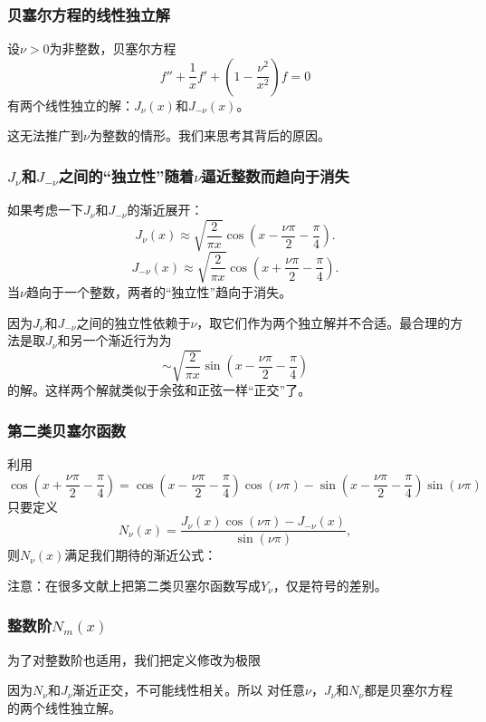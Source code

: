\documentclass[CJK]{beamer}
\begin{document}
\begin{frame}
\frametitle{贝塞尔方程的线性独立解}

设$\nu >0$为非整数，贝塞尔方程
$$f''+\frac{1}{x}f' + \left(1-\frac{\nu^2}{x^2}\right)f = 0$$
有两个线性独立的解：$J_\nu(x)$和$J_{-\nu}(x)$。

\skiplines

这无法推广到$\nu$为整数的情形。我们来思考其背后的原因。

\end{frame}

\begin{frame}
\frametitle{$J_\nu$和$J_{-\nu}$之间的“独立性”随着$\nu$逼近整数而趋向于消失}

如果考虑一下$J_\nu$和$J_{-\nu}$的渐近展开：
$$J_\nu(x) \approx \sqrt{\frac{2}{\pi x}}\cos{\left(x-\frac{\nu \pi}{2}-\frac{\pi}{4}\right)}.$$
$$J_{-\nu}(x) \approx \sqrt{\frac{2}{\pi x}}\cos{\left(x+\frac{\nu \pi}{2}-\frac{\pi}{4}\right)}.$$
当$\nu$趋向于一个整数，两者的“独立性”趋向于消失。

\skipline

因为$J_\nu$和$J_{-\nu}$之间的独立性依赖于$\nu$，取它们作为两个独立解并不合适。最合理的方法是取$J_\nu$和另一个渐近行为为
$$ \sim \sqrt{\frac{2}{\pi x}}\sin{\left(x-\frac{\nu \pi}{2}-\frac{\pi}{4}\right)}$$
的解。这样两个解就类似于余弦和正弦一样“正交”了。

\end{frame}

\begin{frame}
\frametitle{第二类贝塞尔函数}

利用
{\small
$$ \cos{\left(x+\frac{\nu \pi}{2}-\frac{\pi}{4}\right)} = \cos{\left(x-\frac{\nu \pi}{2}-\frac{\pi}{4}\right)}\cos{(\nu\pi)} -  \sin{\left(x-\frac{\nu \pi}{2}-\frac{\pi}{4}\right)}\sin{(\nu\pi)} $$}
只要定义
$$N_\nu(x) = \frac{J_\nu(x)\cos{(\nu\pi)} - J_{-\nu}(x)}{\sin{(\nu\pi)}},$$
则$N_\nu(x)$满足我们期待的渐近公式：

{\blue 注意：在很多文献上把第二类贝塞尔函数写成$Y_\nu$，仅是符号的差别。}
\end{frame}

\begin{frame}
\frametitle{整数阶$N_m(x)$}

为了对整数阶也适用，我们把定义修改为极限

\skiplines

因为$N_\nu$和$J_\nu$渐近正交，不可能线性相关。所以
{\blue
对任意$\nu $，$J_\nu$和$N_\nu$都是贝塞尔方程的两个线性独立解。}

\end{frame}
\end{document}
